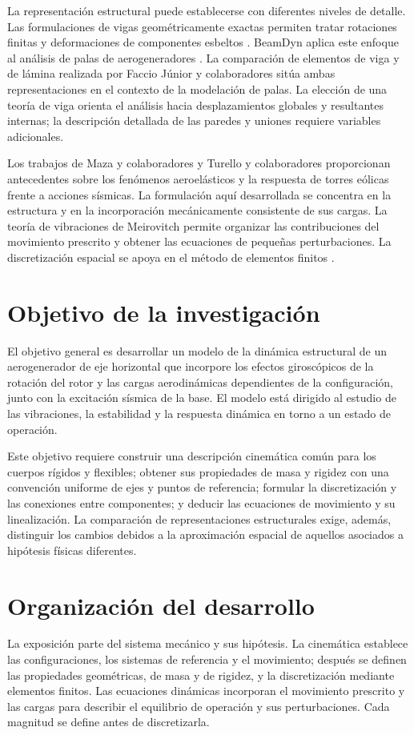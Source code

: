 \documentclass[11pt,a4paper,oneside]{report}
\begin{document}
La representación estructural puede establecerse con diferentes niveles de detalle. Las formulaciones de vigas geométricamente exactas permiten tratar rotaciones finitas y deformaciones de componentes esbeltos \cite{simo1985}. BeamDyn aplica este enfoque al análisis de palas de aerogeneradores \cite{wang2017}. La comparación de elementos de viga y de lámina realizada por Faccio Júnior y colaboradores \cite{faccio2019} sitúa ambas representaciones en el contexto de la modelación de palas. La elección de una teoría de viga orienta el análisis hacia desplazamientos globales y resultantes internas; la descripción detallada de las paredes y uniones requiere variables adicionales.

Los trabajos de Maza y colaboradores \cite{maza2017} y Turello y colaboradores \cite{turello2023} proporcionan antecedentes sobre los fenómenos aeroelásticos y la respuesta de torres eólicas frente a acciones sísmicas. La formulación aquí desarrollada se concentra en la estructura y en la incorporación mecánicamente consistente de sus cargas. La teoría de vibraciones de Meirovitch \cite{meirovitch} permite organizar las contribuciones del movimiento prescrito y obtener las ecuaciones de pequeñas perturbaciones. La discretización espacial se apoya en el método de elementos finitos \cite{reddy}.

\section{Objetivo de la investigación}
El objetivo general es desarrollar un modelo de la dinámica estructural de un aerogenerador de eje horizontal que incorpore los efectos giroscópicos de la rotación del rotor y las cargas aerodinámicas dependientes de la configuración, junto con la excitación sísmica de la base. El modelo está dirigido al estudio de las vibraciones, la estabilidad y la respuesta dinámica en torno a un estado de operación.

Este objetivo requiere construir una descripción cinemática común para los cuerpos rígidos y flexibles; obtener sus propiedades de masa y rigidez con una convención uniforme de ejes y puntos de referencia; formular la discretización y las conexiones entre componentes; y deducir las ecuaciones de movimiento y su linealización. La comparación de representaciones estructurales exige, además, distinguir los cambios debidos a la aproximación espacial de aquellos asociados a hipótesis físicas diferentes.

\section{Organización del desarrollo}
La exposición parte del sistema mecánico y sus hipótesis. La cinemática establece las configuraciones, los sistemas de referencia y el movimiento; después se definen las propiedades geométricas, de masa y de rigidez, y la discretización mediante elementos finitos. Las ecuaciones dinámicas incorporan el movimiento prescrito y las cargas para describir el equilibrio de operación y sus perturbaciones. Cada magnitud se define antes de discretizarla.
\end{document}
